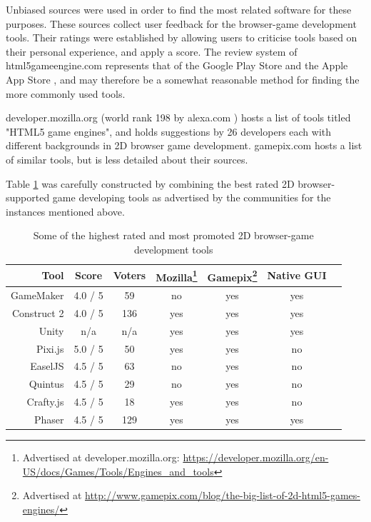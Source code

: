 \documentclass[bsc,frontabs,twoside,singlespacing,parskip,deptreport]{infthesis}     %
\begin{document}
Unbiased sources were used in order to find the most related software for these purposes. These sources collect user feedback for the browser-game development tools. Their ratings were established by allowing users to criticise tools based on their personal experience, and apply a score. The review system of html5gameengine.com \cite{html5_gamedev_tools} represents that of the Google Play Store \cite{Google_Play_Store} and the Apple App Store \cite{Apple_App_Store}, and may therefore be a somewhat reasonable method for finding the more commonly used tools.

developer.mozilla.org \cite{html5_mozilla} (world rank 198 by alexa.com \cite{alexa_ranking}) hosts a list of tools titled "HTML5 game engines", and holds suggestions by 26 developers each with different backgrounds in 2D browser game development. gamepix.com \cite{gamepix_engines} hosts a list of similar tools, but is less detailed about their sources.

Table \ref{table:Related_Tools} was carefully constructed by combining the best rated 2D browser-supported game developing tools as advertised by the communities for the instances mentioned above.

\begin{savenotes}
\begin{table}[H]
\centering
  \begin{tabular}{ | r || c | c | c | c | c | c | }
  	\hline
  	\textbf{Tool}			& \textbf{Score}		& \textbf{Voters}& \textbf{Mozilla}\footnote{Advertised at developer.mozilla.org: \url{https://developer.mozilla.org/en-US/docs/Games/Tools/Engines\_and\_tools}} 	& \textbf{Gamepix}\footnote{Advertised at \url{http://www.gamepix.com/blog/the-big-list-of-2d-html5-games-engines/}} 	& \textbf{Native GUI}\\ \hline\hline
	GameMaker		& 4.0 / 5	& 59	& no	& yes	& yes	\\ \hline
    Construct 2		& 4.0 / 5	& 136	& yes	& yes	& yes	\\ \hline    
    Unity			& n/a		& n/a	& yes	& yes	& yes	\\ \hline
    Pixi.js			& 5.0 / 5	& 50	& yes	& yes	& no	\\ \hline
    EaselJS			& 4.5 / 5	& 63	& no	& yes	& no	\\ \hline
    Quintus			& 4.5 / 5	& 29	& no	& yes	& no	\\ \hline
    Crafty.js		& 4.5 / 5	& 18	& yes	& yes	& no	\\ \hline
    Phaser			& 4.5 / 5	& 129	& yes	& yes	& yes	\\ \hline
  \end{tabular}
  \caption{Some of the highest rated and most promoted 2D browser-game development tools}
  \label{table:Related_Tools}
\end{table}%
\end{savenotes}
\end{document}
